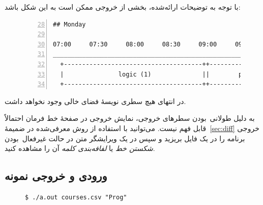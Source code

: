 \documentclass{utap}
\begin{document}
    با توجه به توضیحات ارائه‌شده، بخشی از خروجی ممکن است به این شکل باشد:
    \begin{figure}[H]
    \noindent\hspace{0.1\linewidth}
    \begin{minipage}{0.8\textwidth}
    \begin{latin}
    \begin{Verbatim}[numbers=left,frame=leftline,numbersep=2pt,firstnumber=28,baselinestretch=0.75]
## Monday

07:00     07:30     08:00     08:30     09:00     09:30
_______________________________________________________
  +--------------------------------------++------------
  |               logic (1)              ||        prob
  +--------------------------------------++------------
    \end{Verbatim}
    \end{latin}
    \end{minipage}
    \end{figure}

    در انتهای هیچ سطری نویسهٔ فضای خالی وجود نخواهد داشت.

    به دلیل طولانی~بودن سطرهای خروجی، نمایش خروجی در صفحهٔ خط فرمان احتمالاً قابل فهم نیست. می‌توانید با استفاده از روش معرفی‌شده در ضمیمهٔ~\ref{sec:diff} خروجی برنامه را در یک فایل بریزید و سپس در یک ویرایشگر متن در حالت غیرفعال~بودن \textit{شکستن خط} یا \textit{لفافه‌بندی کلمه} آن را مشاهده کنید.

    \clearpage

    \subsection{ورودی و خروجی نمونه\label{sec:sample}}

    \begin{latin}
    \begin{figure}[H]
    \centering
    \begin{Verbatim}[frame=topline,label={\rl{ورودی}}]
$ ./a.out courses.csv "Prog"
    \end{Verbatim}
    \end{figure}
    \end{latin}

    \begin{latin}
    \begin{figure}[H]
    \centering
    \end{figure}
    \end{latin}
\end{document}

